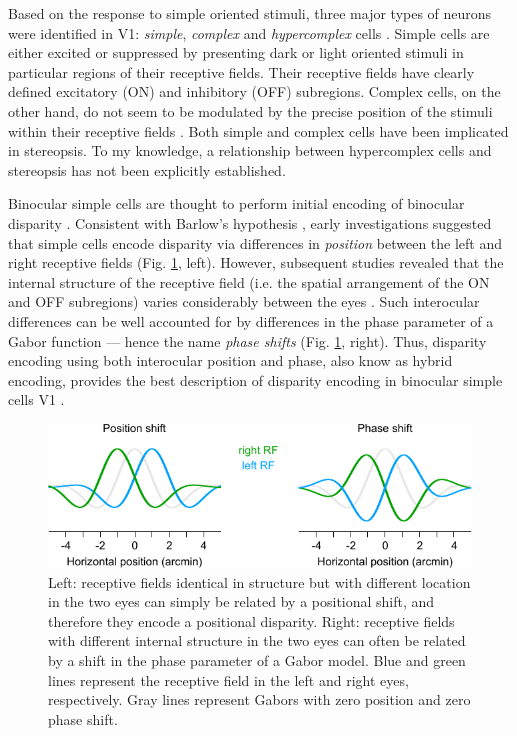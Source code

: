 Based on the response to simple oriented stimuli, three major types of neurons were identified in V1: \textit{simple}, \textit{complex} and \textit{hypercomplex} cells \cite{HUBEL:1962ti,Hubel:1968hz}. Simple cells are either excited or suppressed by presenting dark or light oriented stimuli in particular regions of their receptive fields. Their receptive fields have clearly defined excitatory (ON) and inhibitory (OFF) subregions. Complex cells, on the other hand, do not seem to be modulated by the precise position of the stimuli within their receptive fields \cite{HUBEL:1962ti,Hubel:1968hz}. Both simple and complex cells have been implicated in stereopsis. To my knowledge, a relationship between hypercomplex cells and stereopsis has not been explicitly established. 

Binocular simple cells are thought to perform initial encoding of binocular disparity \cite{Anzai1999,Cumming:1997fk,Ohzawa:1997bd,Ohzawa:1990cq,Ohzawa:1986xy}. Consistent with Barlow's hypothesis \cite{Barlow:1967bs}, early investigations suggested that simple cells encode disparity via differences in \textit{position} between the left and right receptive fields \cite{Heydt:1978mi,Ferster:1981kl} (Fig. \ref{fig:posphase}, left). However, subsequent studies revealed that the internal structure of the receptive field (i.e. the spatial arrangement of the ON and OFF subregions) varies considerably between the eyes \cite{DeAngelis:1991mb,Anzai:1997ud,Anzai:1999xd,Anzai:1999uq,Tsao:2003pi}. Such interocular differences can be well accounted for by differences in the phase parameter of a Gabor function --- hence the name \textit{phase shifts} \cite{DeAngelis1991,Prince:2002uq,Tsao:2003pi} (Fig. \ref{fig:posphase}, right). Thus, disparity encoding using both interocular position and phase, also know as hybrid encoding, provides the best description of disparity encoding in binocular simple cells V1 \cite{Anzai:1997ud,Anzai:1999xd,Prince:2002uq,Tsao:2003pi}.

\begin{figure}
  \centering
  \includegraphics{position-phase}
  \caption[Receptive fields with interocular position and phase shifts.]{Left: receptive fields identical in structure but with different location in the two eyes can simply be related by a positional shift, and therefore they encode a positional disparity. Right: receptive fields with different internal structure in the two eyes can often be related by a shift in the phase parameter of a Gabor model. Blue and green lines represent the receptive field in the left and right eyes, respectively. Gray lines represent Gabors with zero position and zero phase shift.}
  \label{fig:posphase}
\end{figure}

